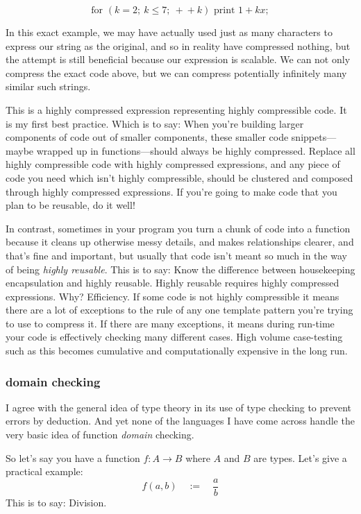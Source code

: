 \documentclass[twoside]{article}
\begin{document}
$$ \mbox{for }(k=2;\ k \le 7;\ +\!\!+\!k)\mbox{ print }1+kx; $$

In this exact example, we may have actually used just as many characters to express our string as the original,
and so in reality have compressed nothing, but the attempt is still beneficial because our expression is scalable.
We can not only compress the exact code above, but we can compress potentially infinitely many similar such strings.

This is a highly compressed expression representing highly compressible code. It is my first best practice. Which is to say:
When you're building larger components of code out of smaller components, these smaller code snippets---maybe wrapped up in
functions---should always be highly compressed. Replace all highly compressible code with highly compressed expressions,
and any piece of code you need which isn't highly compressible, should be clustered and composed through highly
compressed expressions. If you're going to make code that you plan to be reusable, do it well!

In contrast, sometimes in your program you turn a chunk of code into a function because it cleans up otherwise messy details,
and makes relationships clearer, and that's fine and important, but usually that code isn't meant so much in the way of being
\emph{highly reusable}. This is to say: Know the difference between housekeeping encapsulation and highly reusable. Highly
reusable requires highly compressed expressions. Why? Efficiency. If some code is not highly compressible it means there
are a lot of exceptions to the rule of any one template pattern you're trying to use to compress it. If there are many
exceptions, it means during run-time your code is effectively checking many different cases. High volume case-testing
such as this becomes cumulative and computationally expensive in the long run.

\subsubsection*{domain checking}

I agree with the general idea of type theory in its use of type checking to prevent errors by deduction. And yet none
of the languages I have come across handle the very basic idea of function \emph{domain} checking.

So let's say you have a function $ f:A\to B $ where $ A $ and $ B $ are types. Let's give a practical example:
$$ f(a, b)\quad :=\quad \frac{a}{b} $$
This is to say: Division.
\end{document}
